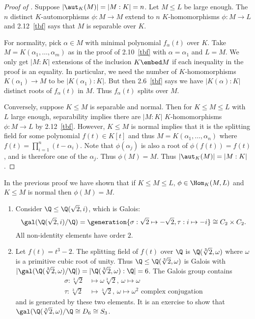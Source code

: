 \documentclass[a4paper]{article}
\begin{document}
\begin{proof}[Proof of ]
  \label{proof:galois criterion}
  Suppose \(|\aut_K(M)| = |M:K| = n\). Let \(M \leq L\) be large enough. The \(n\) distinct \(K\)-automorphisms \(\phi: M \to M\) extend to \(n\) \(K\)-homomorphisms \(\phi: M \to L\) and 2.12~\ref{tbf} says that \(M\) is separable over \(K\).

  For normality, pick \(\alpha \in M\) with minimal polynomial \(f_\alpha(t)\) over \(K\). Take \(M = K(\alpha_1, \dots, \alpha_m)\) as in the proof of 2.10~\ref{tbf} with \(\alpha = \alpha_1\) and \(L = M\). We only get \(|M:K|\) extensions of the inclusion \(K \embed M\) if each inequality in the proof is an equality. In particular, we need the number of \(K\)-homomorphisms \(K(\alpha_1) \to M\) to be \(|K(\alpha_1):K|\). But then 2.6~\ref{tbf} says we have \(|K(\alpha):K|\) distinct roots of \(f_\alpha(t)\) in \(M\). Thus \(f_\alpha(t)\) splits over \(M\).

  Conversely, suppose \(K \leq M\) is separable and normal. Then for \(K \leq M \leq L\) with \(L\) large enough, separability implies there are \(|M:K|\) \(K\)-homomorphisms \(\phi: M \to L\) by 2.12~\ref{tbf}. However, \(K \leq M\) is normal implies that it is the splitting field for some polynomial \(f(t) \in K[t]\) and thus \(M = K(\alpha_1, \dots, \alpha_n)\) where \(f(t) = \prod_{i = 1}^n (t - \alpha_i)\). Note that \(\phi(\alpha_j)\) is also a root of \(\phi(f(t)) = f(t)\), and is therefore one of the \(\alpha_j\). Thus \(\phi(M) = M\). Thus \(|\aut_K(M)| = |M:K|\).
\end{proof}

\begin{remark}
  In the previous proof we have shown that if \(K \leq M \leq L\), \(\phi \in \Hom_K(M, L)\) and \(K \leq M\) is normal then \(\phi(M) = M\).
\end{remark}

\begin{eg}\leavevmode
  \begin{enumerate}
  \item Consider \(\Q \leq \Q(\sqrt 2, i)\), which is Galois:
    \[
      \gal(\Q(\sqrt 2, i)/\Q) = \generation{\sigma: \sqrt 2 \mapsto -\sqrt 2, \tau: i \mapsto -i} \cong C_2 \times C_2.
    \]
    All non-identity elements have order \(2\).
  \item Let \(f(t) = t^3 - 2\). The splitting field of \(f(t)\) over \(\Q\) is \(\Q(\sqrt[3]{2}, \omega)\) where \(\omega\) is a primitive cubic root of unity. Thus \(\Q \leq \Q(\sqrt[3]{2}, \omega)\) is Galois with \(|\gal(\Q(\sqrt[3]{2}, \omega)/\Q|) = |\Q(\sqrt[3]{2}, \omega):\Q| = 6\). The Galois group contains
    \begin{align*}
      \sigma: \sqrt[3]{2} &\mapsto \omega\sqrt[3]{2}, \, \omega \mapsto \omega \\
      \tau: \sqrt[3]{2} &\mapsto \sqrt[3]{2}, \, \omega \mapsto \omega^2 \text{ complex conjugation}
    \end{align*}
    and is generated by these two elements. It is an exercise to show that \(\gal(\Q(\sqrt[3]{2}, \omega)/\Q \cong D_6 \cong S_3\).
  \end{enumerate}
\end{eg}
\end{document}
